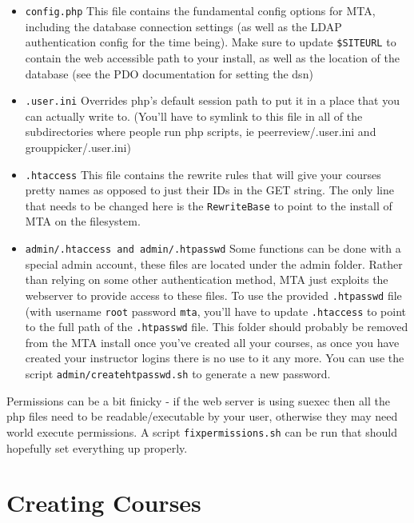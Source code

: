 \documentclass[11pt,letterpaper,oneside]{article}
\begin{document}
\begin{itemize}
  \item \texttt{config.php} This file contains the fundamental config options for MTA, including the database connection settings (as well as the LDAP authentication config for the time being). Make sure to update \texttt{\$SITEURL} to contain the web accessible path to your install, as well as the location of the database (see the PDO documentation for setting the dsn)
  \item \texttt{.user.ini} Overrides php's default session path to put it in a place that you can actually write to. (You'll have to symlink to this file in all of the subdirectories where people run php scripts, ie peerreview/.user.ini and grouppicker/.user.ini)
  \item \texttt{.htaccess} This file contains the rewrite rules that will give your courses pretty names as opposed to just their IDs in the GET string. The only line that needs to be changed here is the \texttt{RewriteBase} to point to the install of MTA on the filesystem.
  \item \texttt{admin/.htaccess and admin/.htpasswd} Some functions can be done with a special admin account, these files are located under the admin folder. Rather than relying on some other authentication method, MTA just exploits the webserver to provide access to these files. To use the provided \texttt{.htpasswd} file (with username \texttt{root} password \texttt{mta},  you'll have to update \texttt{.htaccess} to point to the full path of the \texttt{.htpasswd} file. This folder should probably be removed from the MTA install once you've created all your courses, as once you have created your instructor logins there is no use to it any more. You can use the script \texttt{admin/createhtpasswd.sh} to generate a new password.
\end{itemize}

Permissions can be a bit finicky - if the web server is using suexec then all the php files need to be readable/executable by your user, otherwise they may need world execute permissions. A script \texttt{fixpermissions.sh} can be run that should hopefully set everything up properly.


\section{Creating Courses}
\end{document}
